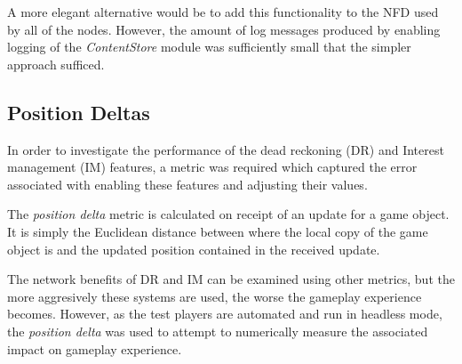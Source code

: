 
A more elegant alternative would be to add this functionality to the NFD used by all of the nodes. However, the amount of log messages produced by enabling logging of the \textit{ContentStore} module was sufficiently small that the simpler approach sufficed.

\subsection{Position Deltas}
In order to investigate the performance of the dead reckoning (DR) and Interest management (IM) features, a metric was required which captured the error associated with enabling these features and adjusting their values.

The \textit{position delta} metric is calculated on receipt of an update for a game object. It is simply the Euclidean distance between where the local copy of the game object is and the updated position contained in the received update. 

The network benefits of DR and IM can be examined using other metrics, but the more aggresively these systems are used, the worse the gameplay experience becomes. However, as the test players are automated and run in headless mode, the \textit{position delta} was used to attempt to numerically measure the associated impact on gameplay experience.


